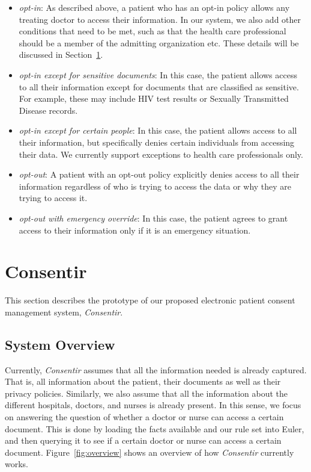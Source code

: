 \documentclass[conference]{IEEEtran}
\begin{document}
\begin{itemize}
 \item \textit{opt-in}: As described above, a patient who has an opt-in policy allows any treating doctor to access their information. In our system, we also
add other conditions that need to be met, such as that the health care professional should be a member of the admitting organization etc. These details will be
discussed in Section~\ref{main-sys}.
\item \textit{opt-in except for sensitive documents}: In this case, the patient allows access to all their information except for documents that are classified
as sensitive. For example, these may include HIV test results or Sexually Transmitted Disease records. 
\item \textit{opt-in except for certain people}: In this case, the patient allows access to all their information, but specifically denies certain individuals
from accessing their data. We currently support exceptions to health care professionals only.
\item \textit{opt-out}: A patient with an opt-out policy explicitly denies access to all their information regardless of who is trying to access the data or
why they are trying to access it.
\item \textit{opt-out with emergency override}: In this case, the patient agrees to grant access to their information only if it is an emergency situation. 
\end{itemize}


\section{Consentir}
\label{main-sys}

This section describes the prototype of our proposed electronic patient consent management system, \textit{Consentir}.

\subsection{System Overview}
\label{info-flow}

Currently, \textit{Consentir} assumes that all the information needed is already captured. That is, all information about the patient, their documents as well
as their
privacy policies. Similarly, we also assume that all the information about the different hospitals, doctors, and nurses is already present. In this sense, we
focus on answering the question of whether a doctor or nurse can access a certain document. This is done by loading the facts available and our rule set into
Euler, and then querying it to see if a certain doctor or nurse can access a certain document. Figure~\ref{fig:overview} shows an overview of how
\textit{Consentir} currently works.
\end{document}
